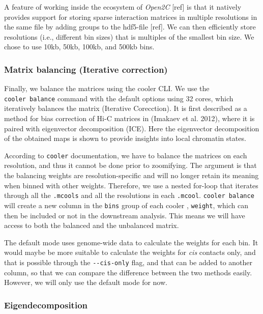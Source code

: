 \documentclass[
  a4paper,
]{scrbook}
\let\oldemph\emph
\renewcommand\emph[1]{\oldemph{\color{gray}#1}}
\begin{document}
A feature of working inside the ecosystem of \emph{Open2C} {[}ref{]} is
that it natively provides support for storing sparse interaction
matrices in multiple resolutions in the same file by adding groups to
the hdf5-file {[}ref{]}. We can then efficiently store resolutions
(i.e., different bin sizes) that is multiples of the smallest bin size.
We chose to use 10kb, 50kb, 100kb, and 500kb bins.

\subsubsection{Matrix balancing (Iterative
correction)}\label{matrix-balancing-iterative-correction}

Finally, we balance the matrices using the cooler CLI. We use the
\texttt{cooler\ balance} command with the default options using 32
cores, which iteratively balances the matrix (Iterative Corecction). It
is first described as a method for bias correction of Hi-C matrices in
(Imakaev et al. 2012), where it is paired with eigenvector decomposition
(ICE). Here the eigenvector decomposition of the obtained maps is shown
to provide insights into local chromatin states.

According to \texttt{cooler} documentation, we have to balance the
matrices on each resolution, and thus it cannot be done prior to
zoomifying. The argument is that the balancing weights are
resolution-specific and will no longer retain its meaning when binned
with other weights. Therefore, we use a nested for-loop that iterates
through all the \texttt{.mcools} and all the resolutions in each
\texttt{.mcool}. \texttt{cooler\ balance} will create a new column in
the \texttt{bins} group of each cooler , \texttt{weight}, which can then
be included or not in the downstream analysis. This means we will have
access to both the balanced and the unbalanced matrix.

The default mode uses genome-wide data to calculate the weights for each
bin. It would maybe be more suitable to calculate the weights for
\emph{cis} contacts only, and that is possible through the
\texttt{-\/-cis-only} flag, and that can be added to another column, so
that we can compare the difference between the two methods easily.
However, we will only use the default mode for now.

\subsubsection{Eigendecomposition}\label{eigendecomposition}
\end{document}
